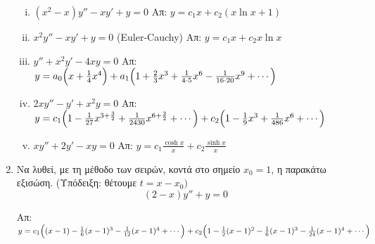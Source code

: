 \begin{enumerate}
\begin{enumerate}[i)]
      \item $ (x^{2}-x)y'' -xy'+y=0 $ %
        \hfill Απ:  $ y= c_{1}x + c_{2}(x \ln{x} + 1) $

      \item $ x^{2}y''-xy'+y=0 $ \quad (Euler-Cauchy) %
        \hfill Απ: $ y= c_{1}x + c_{2}x \ln{x} $ 

      \item $y''+x^2y'-4xy=0$
        \hfill Απ:
        $y= a_{0}\Bigl(x+\frac{1}{4}x^4\Bigr) + a_{1}\Bigl(1+\frac{2}{3}x^3+\frac{1}
        {4\cdot 5}x^6- \frac{1}{16\cdot 20}x^9+\cdots\Bigr) $

      \item $2xy''-y'+x^{2}y=0 $
        \hfill Απ:  $ y= c_{1}\Bigl(1- \frac{1}{27} x^{3+ \frac{3}{2}} + 
        \frac{1}{2430} x^{6+ \frac{3}{2} } + \cdots\Bigr) + 
        c_{2}\Bigl(1 - \frac{1}{9} x^{3} + \frac{1}{486} x^{6} + \cdots \Bigr) $

      \item $xy''+2y'-xy=0$
        \hfill Απ: 
        $y= c_{1}\frac{\cosh x}{x} + c_{2}\frac{\sinh x}{x}$
    \end{enumerate}

  \item Να λυθεί, με τη μέθοδο των σειρών, κοντά στο σημείο $ x_{0}=1 $, η παρακάτω
    εξισώση. (\textcolor{Col1}{Υπόδειξη}: θέτουμε $ t=x- x_{0}) $
    \[ 
      (2-x)y'' + y=0 
    \]

    \hfill Απ: $ y= c_{1}\Bigl((x-1)- \frac{1}{6} (x-1)^{3}- \frac{1}{12} (x-1)^{4} 
      + \cdots\Bigr) + c_{2}\Bigl(1- \frac{1}{2} (x-1)^{2} - \frac{1}{6} (x-1)^{3} 
    - \frac{1}{24} (x-1)^{4} + \cdots \Bigr) $  
\end{enumerate}





